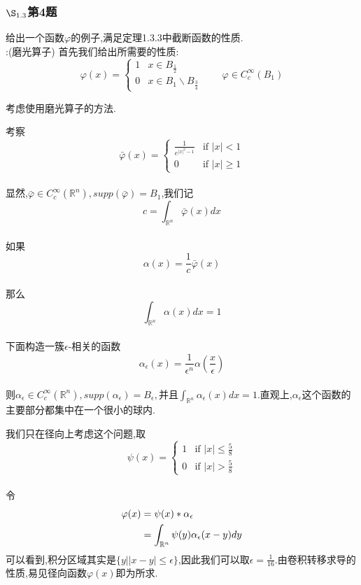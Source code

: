 \documentclass[12pt, a4paper]{ctexart}
\begin{document}
	{\color{red}{在新版教材上,删去了常数$c$,那么极值原理的描述就与书上的一样了.}}
	
	\subsubsection{$\S_{1.3}$第4题}
	\kaishu{}给出一个函数$\varphi$的例子,满足定理1.3.3中截断函数的性质.\\
	
	\songti{}:(磨光算子)
	首先我们给出所需要的性质:$$
	\varphi(x)=\begin{cases}
	1 &  x\in B_{\frac{1}{2}}\\
	0 &  x \in B_1 \backslash B_{\frac{3}{4}}
	\end{cases}	\qquad \varphi \in C_{c}^{\infty}(B_1)$$
	
	考虑使用磨光算子的方法.
	
	考察$$
	\bar{\varphi}(x)=	\begin{cases}
	\frac{1}{e^{|x|^2-1}} & \text{if } |x|<1\\
	0 & \text{if }  |x| \ge 1
	\end{cases}$$ \\
	显然,$\bar{\varphi} \in C_{c}^{\infty}(\mathbb{R}^n),supp(\bar{\varphi})=B_1$,我们记$$
	c=\int_{\mathbb{R}^n} \bar{\varphi}(x)dx	$$\\
	如果$$
	\alpha(x)=\frac{1}{c}\bar{\varphi}(x)	$$\\
	那么$$
	\int_{\mathbb{R}^n} \alpha(x)dx=1	$$\\
	下面构造一簇$\epsilon$-相关的函数$$
	\alpha_{\epsilon}(x)=\frac{1}{\epsilon^n}\alpha\left(\frac{x}{\epsilon}\right)	$$\\
	则$\alpha_{\epsilon} \in C_{c}^{\infty}(\mathbb{R}^n),supp(\alpha_{\epsilon})=B_{\epsilon},\text{并且}\int_{\mathbb{R}^n} \alpha_{\epsilon}(x)dx=1$.直观上,$\alpha_{\epsilon}$这个函数的主要部分都集中在一个很小的球内.
	
	我们只在径向上考虑这个问题,取$$
	\psi(x)=	\begin{cases}
	1 & \text{if } |x|\le \frac{5}{8}\\
	0 & \text{if }  |x| > \frac{5}{8}
	\end{cases}$$ \\
	令
	\begin{align}
		\varphi(x)&=\psi(x)\ast \alpha_{\epsilon} \notag \\
		&= \int_{\mathbb{R}^n} \psi(y) \alpha_{\epsilon}(x-y) dy  \notag
	\end{align}
	可以看到,积分区域其实是$\{ \left. y\right| |x-y| \le \epsilon \} $,因此我们可以取$\epsilon=\frac{1}{16}$.由卷积转移求导的性质,易见径向函数$\varphi(x)$即为所求.
	\\
	
\end{document}
